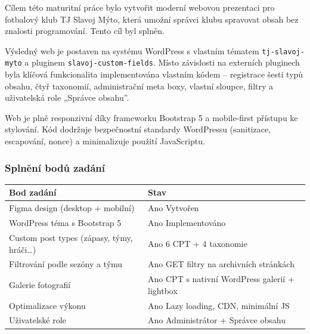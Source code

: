 Cílem této maturitní práce bylo vytvořit moderní webovou prezentaci pro
fotbalový klub TJ Slavoj Mýto, která umožní správci klubu spravovat
obsah bez znalosti programování. Tento cíl byl splněn.

Výsledný web je postaven na systému WordPress s vlastním tématem
\texttt{tj-slavoj-myto} a pluginem \texttt{slavoj-custom-fields}. Místo
závislosti na externích pluginech byla klíčová funkcionalita
implementována vlastním kódem -- registrace šesti typů obsahu, čtyř
taxonomií, administrační meta boxy, vlastní sloupce, filtry a
uživatelská role „Správce obsahu''.

Web je plně responzivní díky frameworku Bootstrap 5 a mobile-first
přístupu ke stylování. Kód dodržuje bezpečnostní standardy WordPressu
(sanitizace, escapování, nonce) a minimalizuje použití JavaScriptu.

\subsubsection{Splnění bodů
zadání}\label{splnux11bnuxed-bodux16f-zaduxe1nuxed}

{\def\LTcaptype{none} %
\begin{longtable}[]{@{}
  >{\raggedright\arraybackslash}p{}
  >{\raggedright\arraybackslash}p{}@{}}
\toprule\noalign{}
\begin{minipage}[b]{\linewidth}\raggedright
Bod zadání
\end{minipage} & \begin{minipage}[b]{\linewidth}\raggedright
Stav
\end{minipage} \\
\midrule\noalign{}
\endhead
\bottomrule\noalign{}
\endlastfoot
Figma design (desktop + mobilní) & Ano Vytvořen \\
WordPress téma s Bootstrap 5 & Ano Implementováno \\
Custom post types (zápasy, týmy, hráči\ldots) & Ano 6 CPT + 4
taxonomie \\
Filtrování podle sezóny a týmu & Ano GET filtry na archivních
stránkách \\
Galerie fotografií & Ano CPT s nativní WordPress galerií + lightbox \\
Optimalizace výkonu & Ano Lazy loading, CDN, minimální JS \\
Uživatelské role & Ano Administrátor + Správce obsahu \\
\end{longtable}
}

